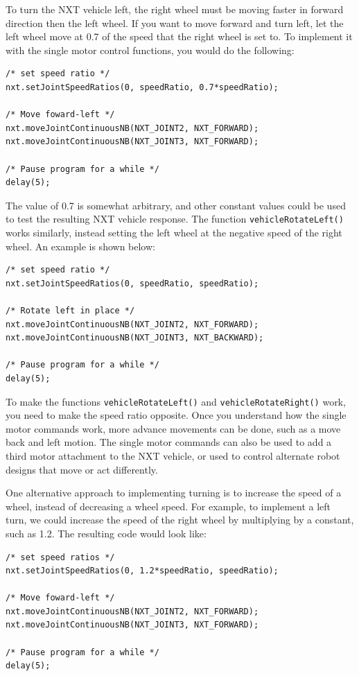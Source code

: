 \documentclass[11pt]{article}
\begin{document}
\noindent
To turn the NXT vehicle left, the right wheel must be moving faster in forward direction then the 
left wheel. If you want to move forward and turn left, let the left wheel move at 0.7 of the 
speed that the right wheel is set to. To implement it with the single motor control functions, you 
would do the following:
\begin{verbatim}
/* set speed ratio */
nxt.setJointSpeedRatios(0, speedRatio, 0.7*speedRatio);

/* Move foward-left */
nxt.moveJointContinuousNB(NXT_JOINT2, NXT_FORWARD);
nxt.moveJointContinuousNB(NXT_JOINT3, NXT_FORWARD);

/* Pause program for a while */
delay(5);
\end{verbatim}
\noindent
The value of 0.7 is somewhat arbitrary, and other constant values could be used to test the resulting
NXT vehicle response. The function \verb+vehicleRotateLeft()+ works similarly, instead setting the 
left wheel at the negative speed of the right wheel. An example is shown below:
\begin{verbatim}
/* set speed ratio */
nxt.setJointSpeedRatios(0, speedRatio, speedRatio);

/* Rotate left in place */
nxt.moveJointContinuousNB(NXT_JOINT2, NXT_FORWARD);
nxt.moveJointContinuousNB(NXT_JOINT3, NXT_BACKWARD);

/* Pause program for a while */
delay(5);
\end{verbatim}
\noindent
To make the functions \verb+vehicleRotateLeft()+ and \verb+vehicleRotateRight()+ work, you need to make
the speed ratio opposite. Once you understand how the single motor commands work, more advance movements
can be done, such as a move back and left motion. The single motor commands can also be used to add a 
third motor attachment to the NXT vehicle, or used to control alternate robot designs that move or act 
differently.\\
\newline

\noindent
One alternative approach to implementing turning is to increase the speed of a wheel, instead of 
decreasing a wheel speed. For example, to implement a left turn, we could increase the speed of 
the right wheel by multiplying by a constant, such as 1.2.  The resulting code would look like:

\begin{verbatim}
/* set speed ratios */
nxt.setJointSpeedRatios(0, 1.2*speedRatio, speedRatio);

/* Move foward-left */
nxt.moveJointContinuousNB(NXT_JOINT2, NXT_FORWARD);
nxt.moveJointContinuousNB(NXT_JOINT3, NXT_FORWARD);

/* Pause program for a while */
delay(5);
\end{verbatim}
\end{document}

